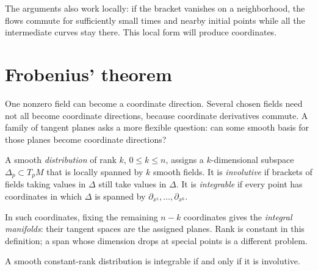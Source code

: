 The arguments also work locally: if the bracket vanishes on a neighborhood, the flows commute for sufficiently small times and nearby initial points while all the intermediate curves stay there. This local form will produce coordinates.

\section{Frobenius' theorem}

One nonzero field can become a coordinate direction. Several chosen fields need not all become coordinate directions, because coordinate derivatives commute. A family of tangent planes asks a more flexible question: can some smooth basis for those planes become coordinate directions?

\begin{definition}
A smooth \emph{distribution} of rank $k$, $0\le k\le n$, assigns a $k$-dimensional subspace $\Delta_p\subset T_pM$ that is locally spanned by $k$ smooth fields. It is \emph{involutive} if brackets of fields taking values in $\Delta$ still take values in $\Delta$. It is \emph{integrable} if every point has coordinates in which $\Delta$ is spanned by $\partial_{x^1},\ldots,\partial_{x^k}$.
\end{definition}

In such coordinates, fixing the remaining $n-k$ coordinates gives the \emph{integral manifolds}: their tangent spaces are the assigned planes. Rank is constant in this definition; a span whose dimension drops at special points is a different problem.

\begin{theorem}[Frobenius]\label{thm:frobenius}
A smooth constant-rank distribution is integrable if and only if it is involutive.
\end{theorem}

